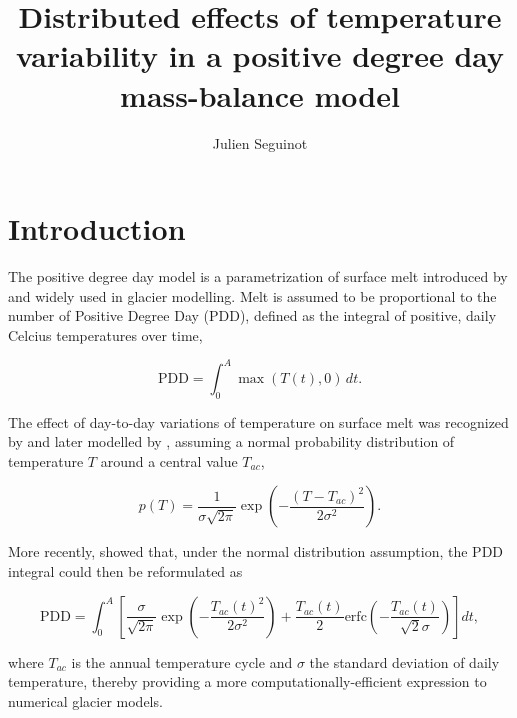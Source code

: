 \documentclass[twocolumn]{igs}
\begin{document}
\title[Temperature variability in a positive degree day model]{Distributed effects of temperature variability in a positive degree day mass-balance model}
\author[J. Seguinot]{Julien Seguinot}

\maketitle


\section{Introduction}

The positive degree day model is a parametrization of surface melt introduced by \citet{braithwaite-1984} and widely used in glacier modelling. Melt is assumed to be proportional to the number of Positive Degree Day (PDD), defined as the integral of positive, daily Celcius temperatures over time,

\begin{equation} \label{eq:pdd}
  \mathrm{PDD} = \int_{0}^{A}\max(T(t),0)\,dt.
\end{equation}

The effect of day-to-day variations of temperature on surface melt was recognized by \citet{braithwaite-1984} and later modelled by \citet{reeh-1991}, assuming a normal probability distribution of temperature $T$ around a central value $T_{ac}$,

\begin{equation} \label{eq:normal}
  p(T) = \frac{1}{\sigma\sqrt{2\pi}}
    \exp\left({-\frac{(T-T_{ac})^2}{2\sigma^2}}\right).
\end{equation}

More recently, \citet{calov-greve-2005} showed that, under the normal distribution assumption, the PDD integral could then be reformulated as

\begin{equation} \label{eq:calovgreve}
  \mathrm{PDD} = \int_{0}^{A} \left[
    \frac{\sigma}{\sqrt{2\pi}}
    \exp\left({-\frac{T_{ac}(t)^2}{2\sigma^2}}\right)
    +\frac{T_{ac}(t)}{2}
    \mathrm{erfc} \left(-\frac{T_{ac}(t)}{\sqrt{2}\sigma}\right)
  \right]dt,
\end{equation}

where $T_{ac}$ is the annual temperature cycle and $\sigma$ the standard deviation of daily temperature, thereby providing a more computationally-efficient expression to numerical glacier models.
\end{document}
